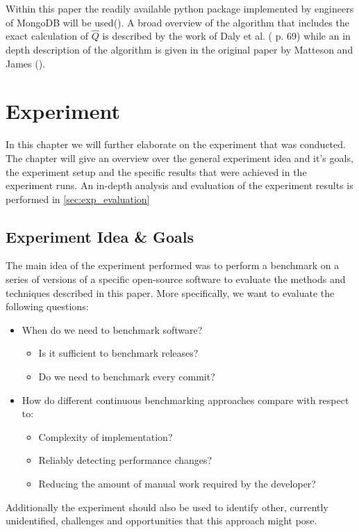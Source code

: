 \documentclass[	runningheads,
				a4paper]{llncs}
\begin{document}
	Within this paper the readily available python package implemented by engineers of MongoDB will be used(\cite{gitmongo}). A broad overview of the algorithm that includes the exact calculation of $\hat{Q}$ is described by the work of Daly et al. (\cite{daly2020} p. 69) while an in depth description of the algorithm is given in the original paper by Matteson and James (\cite{Matteson2013}).

\section{Experiment}
In this chapter we will further elaborate on the experiment that was conducted. The chapter will give an overview over the general experiment idea and it's goals, the experiment setup and the specific results that were achieved in the experiment runs. An in-depth analysis and evaluation of the experiment results is performed in \autoref{sec:exp_evaluation}

	\subsection{Experiment Idea \& Goals}
	\label{ssec:exp_goals}

	The main idea of the experiment performed was to perform a benchmark on a series of versions of a specific open-source software to evaluate the methods and techniques described in this paper. More specifically, we want to evaluate the following questions:
	\begin{itemize}
		\item When do we need to benchmark software?
			\begin{itemize}
				\item Is it sufficient to benchmark releases?
				\item Do we need to benchmark every commit?
			\end{itemize}
		\item How do different continuous benchmarking approaches compare with respect to:
			\begin{itemize}
				\item Complexity of implementation?
				\item Reliably detecting performance changes?
				\item Reducing the amount of manual work required by the developer?
			\end{itemize}
	\end{itemize}

	Additionally the experiment should also be used to identify other, currently unidentified, challenges and opportunities that this approach might pose.
\end{document}
